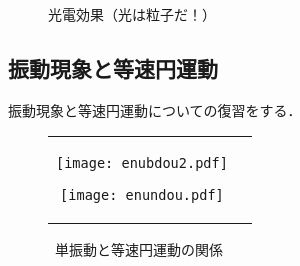             \begin{figure}[hbt]
                \begin{center}
                    \caption{光電効果（光は粒子だ！）}
                    \label{fig:kouden_kouka_image_2}
                \end{center}
            \end{figure}

            \subsection{振動現象と等速円運動}
                振動現象と等速円運動についての復習をする．

                                \begin{figure}[hbt]
                                    \begin{tabular}{cc}
                                        \begin{minipage}{0.5\hsize}
                                                        \begin{center}
                                                            \texttt{[image: enubdou2.pdf]}
                                                            \caption{\ 等速円運動の関係}
                                                            \label{fig:enubdou2}
                                                        \end{center}
                                        \end{minipage}
                                        \begin{minipage}{0.5\hsize}
                                                        \begin{center}
                                                            \texttt{[image: enundou.pdf]}
                                                            \caption{\ 単振動と等速円運動の関係}
                                                            \label{fig:enundou}
                                                        \end{center}
                                        \end{minipage}
                                    \end{tabular}
                                \end{figure}

